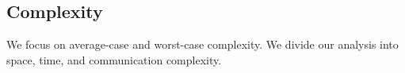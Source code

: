 





\subsection{Complexity}
\label{sec:complexity}


We focus on average-case and worst-case complexity. We divide our
analysis into space, time, and communication complexity.

